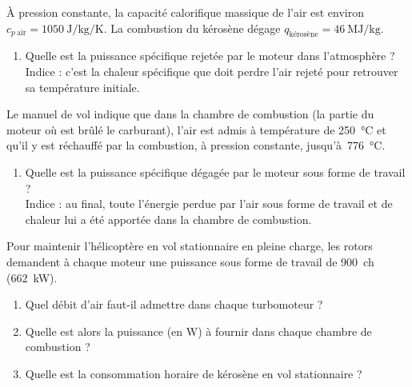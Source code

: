 	À pression constante, la capacité calorifique massique de l’air est environ $c_{p\ \text{air}} = \SI{1050}{\joule\per\kilogram\per\kelvin}$. La combustion du kérosène dégage $q_{\text{kérosène}} = \SI{46}{\mega\joule\per\kilogram}$.

	\begin{enumerate}
		\item Quelle est la puissance spécifique rejetée par le moteur dans l’atmosphère ?\\
			\footnotesize{Indice : c’est la chaleur spécifique que doit perdre l’air rejeté pour retrouver sa température initiale.}
	\end{enumerate}

	Le manuel de vol indique que dans la chambre de combustion (la partie du moteur où est brûlé le carburant), l’air est admis à température de \SI{250}{\degreeCelsius} et qu’il y est réchauffé par la combustion, à pression constante, jusqu’à~\SI{776}{\degreeCelsius}.
	
	\begin{enumerate}
		\item Quelle est la puissance spécifique dégagée par le moteur sous forme de travail ?\\
			\footnotesize{Indice : au final, toute l’énergie perdue par l’air sous forme de travail et de chaleur lui a été apportée dans la chambre de combustion.}
	\end{enumerate}
		
	Pour maintenir l’hélicoptère en vol stationnaire en pleine charge, les rotors demandent à chaque moteur une puissance sous forme de travail de \SI{900}{ch} (\SI{662}{\kilo\watt}).
	
	\begin{enumerate}
		\item Quel débit d’air faut-il admettre dans chaque turbomoteur ?
		\item Quelle est alors la puissance (en \si{\watt}) à fournir dans chaque chambre de combustion ?
		\item Quelle est la consommation horaire de kérosène en vol stationnaire ?
	\end{enumerate}

\exercisesolutionpage
\titreresultats

